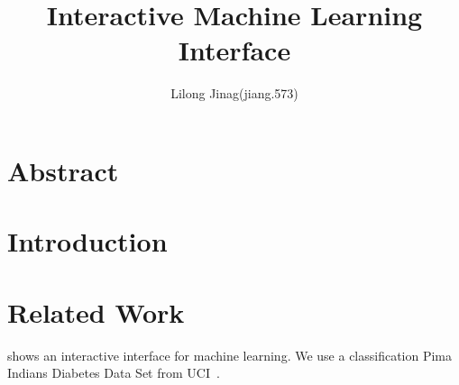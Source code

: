 \documentclass{article}
\begin{document}
\title{Interactive Machine Learning Interface}
\author{Lilong Jinag(jiang.573)}
\maketitle
\section{Abstract}
\section{Introduction}
\section{Related Work}
\cite{crotty2015vizdom} shows an interactive interface for machine learning. 
We use a classification Pima Indians Diabetes Data Set from UCI~\cite{smith1988using}.


\end{document}
